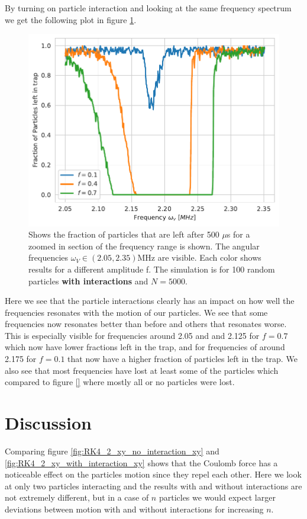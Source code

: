 \documentclass[english,notitlepage,reprint,nofootinbib]{revtex4-1}  %
\begin{document}
By turning on particle interaction and looking at the same frequency spectrum we get the following plot in figure \ref{fig:narrow_freq_p_left_N_5000_interaction_zoom}.
\begin{figure}[H]
    \centering
    \includegraphics[width=.5\textwidth]{../figures/narrow_freq_p_left_N_5000_interaction_zoom.pdf}
    \caption{Shows the fraction of particles that are left after 500 $\mu$s for a zoomed in section of the frequency range
            is shown. The angular frequencies $\omega_V \in (2.05,2.35)$MHz are visible. Each color shows results for a
            different amplitude f. The simulation is for 100 random particles \textbf{with interactions} and $N = 5000$.}
    \label{fig:narrow_freq_p_left_N_5000_interaction_zoom}
\end{figure}
Here we see that the particle interactions clearly has an impact on how well the frequencies resonates with the motion of our particles. We see that some frequencies now resonates better than before and others that resonates worse. This is especially visible for frequencies around 2.05 and and 2.125 for $f=0.7$ which now have lower fractions left in the trap, and for frequencies of around 2.175 for $f=0.1$ that now have a higher fraction of particles left in the trap. We also see that most frequencies have lost at least some of the particles which compared to figure \ref{} where mostly all or no particles were lost.

\section{Discussion}\label{sec:discussion}


Comparing figure \ref{fig:RK4_2_xy_no_interaction_xy} and \ref{fig:RK4_2_xy_with_interaction_xy} shows that the Coulomb force has a noticeable effect on
the particles motion since they repel each other. Here we look at only two particles interacting and the results with and without interactions are not extremely different,
but in a case of $n$ particles we would expect larger deviations between motion with and without interactions for increasing $n$.
\end{document}
